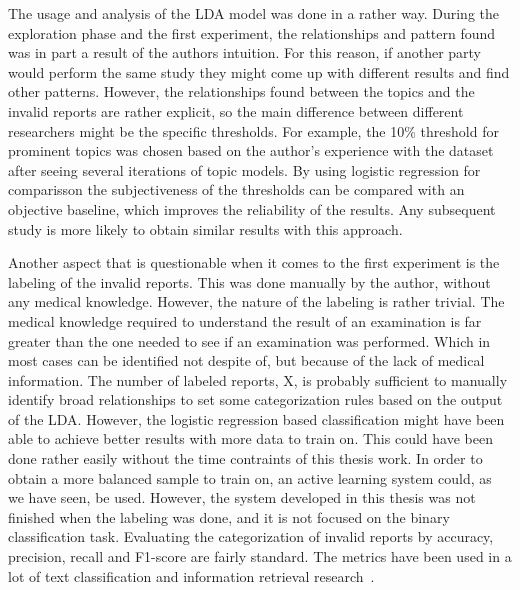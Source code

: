 The usage and analysis of the LDA model was done in a rather way.
During the exploration phase and the first experiment, the relationships and pattern found was in part a result of the authors intuition.
For this reason, if another party would perform the same study they might come up with different results and find other patterns.
However, the relationships found between the topics and the invalid reports are rather explicit, so the main difference between different researchers might be the specific thresholds.
For example, the 10\% threshold for prominent topics was chosen based on the author's experience with the dataset after seeing several iterations of topic models.
By using logistic regression for comparisson the subjectiveness of the thresholds can be compared with an objective baseline, which improves the reliability of the results.
Any subsequent study is more likely to obtain similar results with this approach.

Another aspect that is questionable when it comes to the first experiment is the labeling of the invalid reports.
This was done manually by the author, without any medical knowledge.
However, the nature of the labeling is rather trivial.
The medical knowledge required to understand the result of an examination is far greater than the one needed to see if an examination was performed.
Which in most cases can be identified not despite of, but because of the lack of medical information.
The number of labeled reports, X, is probably sufficient to manually identify broad relationships to set some categorization rules based on the output of the LDA.
However, the logistic regression based classification might have been able to achieve better results with more data to train on.
This could have been done rather easily without the time contraints of this thesis work.
In order to obtain a more balanced sample to train on, an active learning system could, as we have seen, be used.
However, the system developed in this thesis was not finished when the labeling was done, and it is not focused on the binary classification task.
Evaluating the categorization of invalid reports by accuracy, precision, recall and F1-score are fairly standard.
The metrics have been used in a lot of text classification and information retrieval research~\cite{aggarwal2012surveyclass, bishop2006pattern}.

